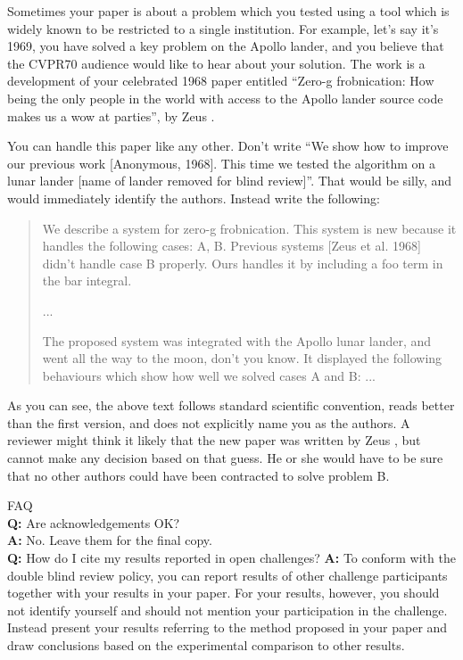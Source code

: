 \documentclass[10pt,twocolumn,letterpaper]{article}
\begin{document}
Sometimes your paper is about a problem which you tested using a tool which
is widely known to be restricted to a single institution.  For example,
let's say it's 1969, you have solved a key problem on the Apollo lander,
and you believe that the CVPR70 audience would like to hear about your
solution.  The work is a development of your celebrated 1968 paper entitled
``Zero-g frobnication: How being the only people in the world with access to
the Apollo lander source code makes us a wow at parties'', by Zeus \etal.

You can handle this paper like any other.  Don't write ``We show how to
improve our previous work [Anonymous, 1968].  This time we tested the
algorithm on a lunar lander [name of lander removed for blind review]''.
That would be silly, and would immediately identify the authors. Instead
write the following:
\begin{quotation}
\noindent
   We describe a system for zero-g frobnication.  This
   system is new because it handles the following cases:
   A, B.  Previous systems [Zeus et al. 1968] didn't
   handle case B properly.  Ours handles it by including
   a foo term in the bar integral.

   ...

   The proposed system was integrated with the Apollo
   lunar lander, and went all the way to the moon, don't
   you know.  It displayed the following behaviours
   which show how well we solved cases A and B: ...
\end{quotation}
As you can see, the above text follows standard scientific convention,
reads better than the first version, and does not explicitly name you as
the authors.  A reviewer might think it likely that the new paper was
written by Zeus \etal, but cannot make any decision based on that guess.
He or she would have to be sure that no other authors could have been
contracted to solve problem B.
\medskip

\noindent
FAQ\medskip\\
{\bf Q:} Are acknowledgements OK?\\
{\bf A:} No.  Leave them for the final copy.\medskip\\
{\bf Q:} How do I cite my results reported in open challenges?
{\bf A:} To conform with the double blind review policy, you can report results of other challenge participants together with your results in your paper. For your results, however, you should not identify yourself and should not mention your participation in the challenge. Instead present your results referring to the method proposed in your paper and draw conclusions based on the experimental comparison to other results.\medskip\\
\end{document}
